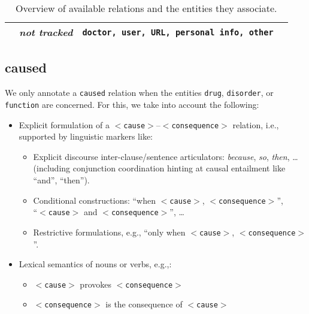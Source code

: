 \documentclass[12pt]{article}
\theoremstyle{definition}
\newcommand{\dis}{\texttt{disorder}\xspace}
\newcommand{\dr}{\texttt{drug}\xspace}
\newcommand{\cause}{$<$\texttt{cause}$>$\xspace}
\newcommand{\conseq}{$<$\texttt{consequence}$>$\xspace}
\begin{document}
\begin{table}[H]
\begin{tabular}{@{}llp{16em}l@{}}
& \textit{not tracked} & \texttt{doctor, user, URL, personal info, other} & \\
\bottomrule
\end{tabular}
\caption{Overview of available relations and the entities they associate.}
\label{tab:relations}
\end{table}




\subsection{caused}\label{rel_caused}


We only annotate a \texttt{caused} relation when the entities \dr, \dis, or \texttt{function} are concerned. 
For this, we take into account the following:
\begin{itemize}
    \item Explicit formulation of a \cause--\conseq relation, i.e., supported by linguistic markers like:
    \begin{itemize}
        \item Explicit discourse inter-clause/sentence articulators: \textit{because}, \textit{so}, \textit{then}, \ldots (including conjunction coordination hinting at  causal entailment like ``and'', ``then''). %
        \item Conditional constructions: ``when \cause , \conseq'',  \\ ``\cause and \conseq'', \ldots
        \item Restrictive formulations, e.g., ``only when \cause , \conseq''.
    \end{itemize}
    \item Lexical semantics of nouns or verbs, e.g.,:
    \begin{itemize}
        \item \cause  provokes \conseq
        \item \conseq is the consequence of \cause

\end{itemize}
\end{itemize}
\end{document}
